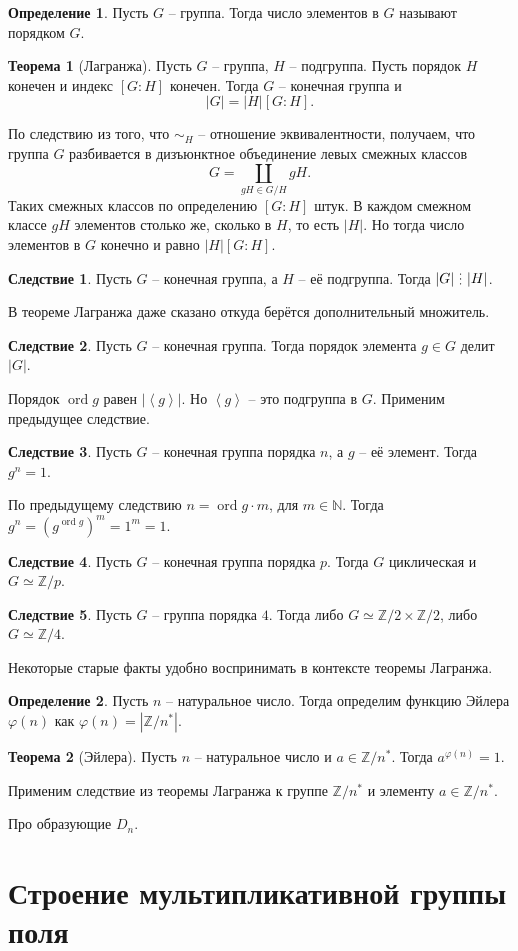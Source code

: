 \documentclass[10pt,a4paper,oneside]{book}
\theoremstyle{definition}
\newtheorem*{defn}{\color{yellow!30!red} Определение}
\newtheorem{thm}{\color{red!40!black}Теорема}
\newtheorem{cor}{\color{green!45!black}Следствие}
\newcommand{\mb}[1]{\mathbb{#1}}
\newcommand{\ord}{\operatorname{ord}}
\newcommand{\di}{\mathop{\,\scalebox{0.85}{\raisebox{-1.2pt}[0.5\height]{\vdots}}\,}}
\def\ffi{\varphi}
\def\lan{\left\langle }
\def\ran{\right\rangle}
\def\thrm{\begin{thm}}
\def\ethrm{\end{thm}}
\def\dfn{\begin{defn}}
\def\edfn{\end{defn}}
\def\crl{\begin{cor}}
\def\ecrl{\end{cor}}
\begin{document}
\dfn Пусть $G$ -- группа. Тогда число элементов в $G$ называют порядком $G$.
\edfn

\thrm[Лагранжа]  Пусть $G$ -- группа, $H$ -- подгруппа. Пусть порядок  $H$ конечен и индекс $[G:H]$ конечен. Тогда $G$ -- конечная группа и 
 $$|G|=|H|[G:H].$$
\ethrm
\proof По следствию из того, что $\sim_H$ -- отношение эквивалентности, получаем, что группа $G$ разбивается в дизъюнктное объединение левых смежных классов $$G=\coprod_{gH \in G/H} gH.$$
Таких смежных классов по определению $[G:H]$ штук. В каждом смежном классе $gH$ элементов столько же, сколько в $H$, то есть $|H|$. Но тогда число элементов в $G$ конечно и равно $|H|[G:H]$.
\endproof

\crl Пусть $G$ -- конечная группа, а $H$ -- её подгруппа. Тогда $|G| \di |H|$. 
\ecrl 
\proof В теореме Лагранжа даже сказано откуда берётся дополнительный множитель.
\endproof

\crl Пусть $G$ -- конечная группа. Тогда порядок элемента $g\in G$ делит $|G|$.
\ecrl
\proof Порядок $\ord g$ равен $|\lan g\ran|$. Но $\lan g\ran$ -- это подгруппа в $G$. Применим предыдущее следствие.
\endproof

\crl Пусть $G$ -- конечная группа порядка $n$, а $g$ -- её элемент. Тогда $g^n=1$.
\ecrl  
\proof По предыдущему следствию $n= \ord g \cdot m$, для $m\in \mb N$. Тогда $g^n=(g^{\ord g})^m=1^m=1$. 
\endproof

\crl Пусть $G$ -- конечная группа порядка $p$. Тогда $G$ циклическая и $G \simeq \mb Z/p$. 
\ecrl

\crl Пусть $G$ -- группа порядка $4$. Тогда либо $G \simeq \mb Z/2 \times \mb Z/2$, либо $G \simeq \mb Z/4$.
\ecrl



Некоторые старые факты удобно воспринимать в контексте теоремы Лагранжа.

\dfn Пусть $n$ -- натуральное число. Тогда определим функцию Эйлера $\ffi(n)$ как $\ffi(n)=|\mb Z/n^*|$. 
\edfn 

\thrm[Эйлера] Пусть $n$ -- натуральное число и $a\in \mb Z/n^*$. Тогда $a^{\ffi(n)}=1$.
\ethrm
\proof
Применим следствие из теоремы Лагранжа к группе $\mb Z/n^*$ и элементу $a\in \mb Z/n^*$.
\endproof

Про образующие $D_n$.




\section{Строение мультипликативной группы поля}
\end{document}
